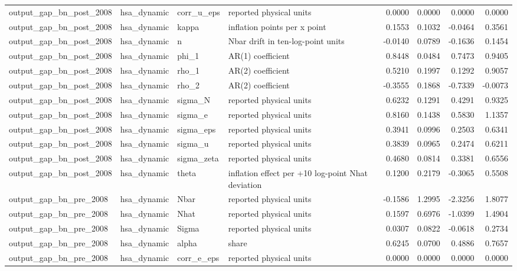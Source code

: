 \begin{tabular}{llllrrrr}
output\_gap\_bn\_post\_2008 & hsa\_dynamic & corr\_u\_eps & reported physical units & 0.0000 & 0.0000 & 0.0000 & 0.0000 \\
output\_gap\_bn\_post\_2008 & hsa\_dynamic & kappa & inflation points per x point & 0.1553 & 0.1032 & -0.0464 & 0.3561 \\
output\_gap\_bn\_post\_2008 & hsa\_dynamic & n & Nbar drift in ten-log-point units & -0.0140 & 0.0789 & -0.1636 & 0.1454 \\
output\_gap\_bn\_post\_2008 & hsa\_dynamic & phi\_1 & AR(1) coefficient & 0.8448 & 0.0484 & 0.7473 & 0.9405 \\
output\_gap\_bn\_post\_2008 & hsa\_dynamic & rho\_1 & AR(2) coefficient & 0.5210 & 0.1997 & 0.1292 & 0.9057 \\
output\_gap\_bn\_post\_2008 & hsa\_dynamic & rho\_2 & AR(2) coefficient & -0.3555 & 0.1868 & -0.7339 & -0.0073 \\
output\_gap\_bn\_post\_2008 & hsa\_dynamic & sigma\_N & reported physical units & 0.6232 & 0.1291 & 0.4291 & 0.9325 \\
output\_gap\_bn\_post\_2008 & hsa\_dynamic & sigma\_e & reported physical units & 0.8160 & 0.1438 & 0.5830 & 1.1357 \\
output\_gap\_bn\_post\_2008 & hsa\_dynamic & sigma\_eps & reported physical units & 0.3941 & 0.0996 & 0.2503 & 0.6341 \\
output\_gap\_bn\_post\_2008 & hsa\_dynamic & sigma\_u & reported physical units & 0.3839 & 0.0965 & 0.2474 & 0.6211 \\
output\_gap\_bn\_post\_2008 & hsa\_dynamic & sigma\_zeta & reported physical units & 0.4680 & 0.0814 & 0.3381 & 0.6556 \\
output\_gap\_bn\_post\_2008 & hsa\_dynamic & theta & inflation effect per +10 log-point Nhat deviation & 0.1200 & 0.2179 & -0.3065 & 0.5508 \\
output\_gap\_bn\_pre\_2008 & hsa\_dynamic & Nbar & reported physical units & -0.1586 & 1.2995 & -2.3256 & 1.8077 \\
output\_gap\_bn\_pre\_2008 & hsa\_dynamic & Nhat & reported physical units & 0.1597 & 0.6976 & -1.0399 & 1.4904 \\
output\_gap\_bn\_pre\_2008 & hsa\_dynamic & Sigma & reported physical units & 0.0307 & 0.0822 & -0.0618 & 0.2734 \\
output\_gap\_bn\_pre\_2008 & hsa\_dynamic & alpha & share & 0.6245 & 0.0700 & 0.4886 & 0.7657 \\
output\_gap\_bn\_pre\_2008 & hsa\_dynamic & corr\_e\_eps & reported physical units & 0.0000 & 0.0000 & 0.0000 & 0.0000 \\

\end{tabular}
